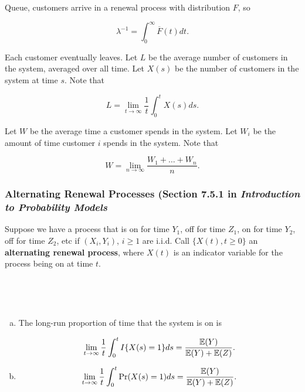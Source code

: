 \begin{exercise} Queue, customers arrive in a renewal process with distribution \(F\), so 

\[
\lambda^{-1} = \int_0^\infty \overline{F}(t) dt.
\]

Each customer eventually leaves. Let \(L\) be the average number of customers in the system, averaged over all time. Let \(X(s)\) be the number of customers in the system at time \(s\). Note that

\[
L = \lim_{t \to \infty} \frac{1}{t} \int_0^t X(s) ds.
\]

Let \(W\) be the average time a customer spends in the system. Let \(W_i\) be the amount of time customer \(i\) spends in the system. Note that

\[
W = \lim_{n \to \infty} \frac{W_1 + \ldots + W_n}{n}.
\]



\end{exercise}


\begin{solution}

\end{solution}

\subsubsection{Alternating Renewal Processes (Section 7.5.1 in \textit{Introduction to Probability Models}}

\begin{definition} Suppose we have a process that is on for time \(Y_1\), off for time \(Z_1\), on for time \(Y_2\), off for time \(Z_2\), etc if \((X_i, Y_i)\), \(i \geq 1\) are i.i.d. Call \(\{X(t), t \geq 0\}\) an \textbf{alternating renewal process}, where \(X(t)\) is an indicator variable for the process being on at time \(t\).

\end{definition}

\


\begin{proposition}\label{stoch.prop.7.4}

\

\begin{enumerate}[(a)]

\item The long-run proportion of time that the system is on is

\[
\lim_{t \to \infty} \frac{1}{t} \int_0^t I\{X(s) = 1 \} ds =  \frac{\E(Y)}{\E(Y) + \E(Z)}.
\]

\item \[
\lim_{t \to \infty} \frac{1}{t} \int_0^t \Pr(X(s) = 1)  ds  =  \frac{\E(Y)}{\E(Y) + \E(Z)}.
\]


\end{enumerate}

\end{proposition}

